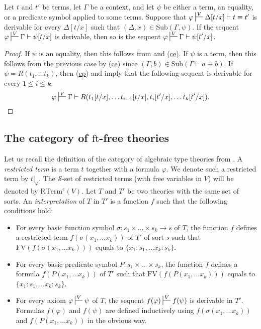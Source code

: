 \documentclass[reqno]{amsart}
\newcommand{\axref}[1]{(\hyperref[ax:#1]{#1})}
\theoremstyle{definition}
\theoremstyle{remark}
\newcommand{\fs}[1]{\mathrm{#1}}
\newcommand{\RTerm}{\fs{RTerm}}
\newcommand{\FV}{\fs{FV}}
\newcommand{\ft}{\fs{ft}}
\newcommand{\sub}{\fs{Sub}}
\numberwithin{figure}{section}
\begin{document}
\begin{lem}
Let $t$ and $t'$ be terms, let $\Gamma$ be a context, and let $\psi$ be either a term, an equality, or a predicate symbol applied to some terms.
Suppose that $\varphi \sststile{}{V} \Delta[t/x] \vdash t \equiv t'$ is derivable for every $\Delta[t/x]$ such that $(\Delta,x) \in \sub(\Gamma,\psi)$.
If the sequent $\varphi \sststile{}{V} \Gamma \vdash \psi[t/x]$ is derivable, then so is the sequent $\varphi \sststile{}{V} \Gamma \vdash \psi[t'/x]$.
\end{lem}
\begin{proof}
If $\psi$ is an equality, then this follows from  and \axref{ce}.
If $\psi$ is a term, then this follows from the previous case by \axref{ce} since $(\Gamma,b) \in \sub(\Gamma \vdash a \equiv b)$.
If $\psi = R(t_1, \ldots t_k)$, then \axref{cp} and  imply that the following sequent is derivable for every $1 \leq i \leq k$:
\[ \varphi \sststile{}{V} \Gamma \vdash R(t_1[t/x], \ldots t_{i-1}[t/x], t_i[t'/x], \ldots t_k[t'/x]). \]
\end{proof}

\subsection{The category of $\ft$-free theories}
\label{sec:types}

Let us recall the definition of the category of algebraic type theories from \cite{alg-tt}.
A \emph{restricted term} is a term $t$ together with a formula $\varphi$.
We denote such a restricted term by $t|_\varphi$.
The $\mathcal{S}$-set of restricted terms (with free variables in $V$) will be denoted by $\RTerm^e(V)$.
Let $T$ and $T'$ be two theories with the same set of sorts.
An \emph{interpretation} of $T$ in $T'$ is a function $f$ such that the following conditions hold:
\begin{itemize}
\item For every basic function symbol $\sigma : s_1 \times \ldots \times s_k \to s$ of $T$,
the function $f$ defines a restricted term $f(\sigma(x_1, \ldots x_k))$ of $T'$ of sort $s$ such that $\FV(f(\sigma(x_1, \ldots x_k)))$ equals to $\{ x_1 : s_1, \ldots x_k : s_k \}$.
\item For every basic predicate symbol $P : s_1 \times \ldots \times s_k$,
the function $f$ defines a formula $f(P(x_1, \ldots x_k))$ of $T'$ such that $\FV(f(P(x_1, \ldots x_k)))$ equals to $\{ x_1 : s_1, \ldots x_k : s_k \}$.
\item For every axiom $\varphi \sststile{}{V} \psi$ of $T$, the sequent $f(\varphi) \sststile{}{V} f(\psi)$ is derivable in $T'$.
Formulas $f(\varphi)$ and $f(\psi)$ are defined inductively using $f(\sigma(x_1, \ldots x_k))$ and $f(P(x_1, \ldots x_k))$ in the obvious way.
\end{itemize}
\end{document}
